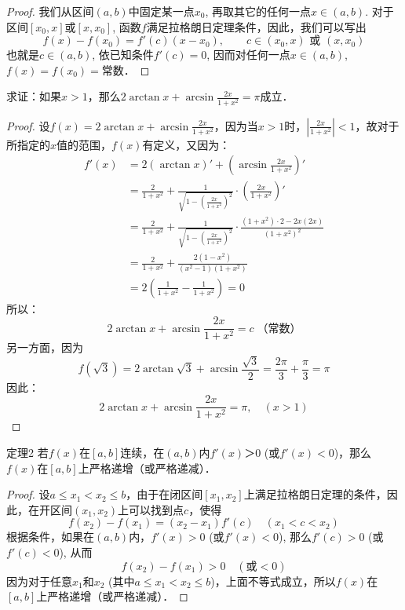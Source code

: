 \begin{proof}
  我们从区间$(a,b)$中固定某一点$x_0$, 再取其它的任何一点$x\in (a,b)$. 对于区间$[x_0,x]$或$[x,x_0]$, 函数$f$满足拉格朗日定理条件，因此，我们可以写出
  \[f (x) -f (x_0) =f' (c) (x-x_0),\qquad c\in (x_0,x)\text{ 或 }(x,x_0)\]
  也就是$c\in (a,b)$, 依已知条件$f'(c)=0$, 因而对任何一点$x\in (a,b)$, $f(x)=f(x_0)=$常数．  
\end{proof}



\begin{example}
    求证：如果$x>1$，那么$2\arctan x+\arcsin\frac{2x}{1+x^2}=\pi$成立．
\end{example}

\begin{proof}
设$f(x)=2\arctan x+\arcsin\frac{2x}{1+x^2}$，因为当$x>1$时，$\left|\frac{2x}{1+x^2}\right|<1$，故对于所指定的$x$值的范围，$f(x)$有定义，又因为：
\begin{align*}
    f'(x)&=2(\arctan x)'+\left(\arcsin\frac{2x}{1+x^2}\right)'\\
    &=\frac{2}{1+x^2}+\frac{1}{\sqrt{1-\left(\frac{2x}{1+x^2}\right)^2}}\cdot \left(\frac{2x}{1+x^2}\right)'\\
    &=\frac{2}{1+x^2}+\frac{1}{\sqrt{1-\left(\frac{2x}{1+x^2}\right)^2}}\cdot \frac{(1+x^2)\cdot 2-2x(2x)}{(1+x^2)^2}\\
    &=\frac{2}{1+x^2}+\frac{2(1-x^2)}{(x^2-1)(1+x^2)}\\
    &=2\left(\frac{1}{1+x^2}-\frac{1}{1+x^2}\right)=0
\end{align*}
所以：
\[2\arctan x+\arcsin\frac{2x}{1+x^2}=c\; \text{（常数）}\]
另一方面，因为
\[f\left(\sqrt{3}\right)=2\arctan\sqrt{3}+\arcsin\frac{\sqrt{3}}{2}=\frac{2\pi}{3}+\frac{\pi}{3}=\pi\]
因此：
\[2\arctan x+\arcsin\frac{2x}{1+x^2}=\pi,\quad (x>1)\]
\end{proof}


\begin{blk}
    {定理2} 若$f(x)$在$[a,b]$连续，在$(a,b)$内$f'(x)＞0$ (或$f'(x)<0$)，那么$f(x)$在$[a,b]$上严格递增（或严格递减）．
\end{blk}


\begin{proof}
    设$a\le x_1<x_2\le b$，由于在闭区间$[x_1,x_2]$上满足拉格朗日定理的条件，因此，在开区间$(x_1,x_2)$上可以找到点$c$，使得
\[f(x_2)-f(x_1)=(x_2-x_1)f'(c)\quad (x_1<c<x_2)\]
根据条件，如果在$(a,b)$内，$f'(x)>0$ (或$f'(x)<0$), 那么$f'(c)>0$ (或$f'(c)<0$), 从而
\[f(x_2)-f(x_1)>0\quad (\text{或}<0)\]
因为对于任意$x_1$和$x_2$ (其中$a\le x_1<x_2\le b$)，上面不等式成立，所以$f(x)$在$[a,b]$上严格递增（或严格递减）．
\end{proof}


